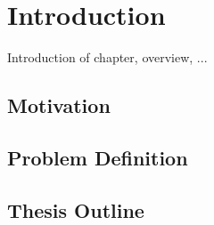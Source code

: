 
\chapter{Introduction} %
\label{cha:introduction}

Introduction of chapter, overview, ...

\section{Motivation}
\label{sec:motivation}


\section{Problem Definition}
\label{sec:problem_definition}


\section{Thesis Outline}
\label{sec:thesis_outline}


